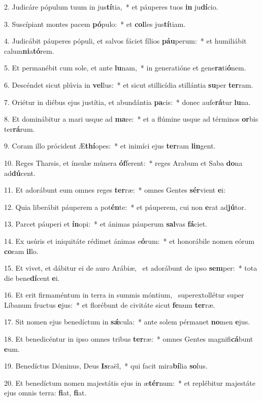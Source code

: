 2. Judicáre pópulum tuum in jus\textbf{tí}tia,~*  et páuperes tuos \textbf{in} ju\textbf{dí}cio.\

3. Suscípiant montes pacem \textbf{pó}pulo:~*  et \textbf{col}les jus\textbf{tí}tiam.\

4. Judicábit páuperes pópuli, et salvos fáciet fílios \textbf{páu}perum:~*  et humiliábit calum\textbf{ni}a\textbf{tó}rem.\

5. Et permanébit cum sole, et ante \textbf{lu}nam,~*  in generatióne et gene\textbf{ra}ti\textbf{ó}nem.\

6. Descéndet sicut plúvia in \textbf{vel}lus:~*  et sicut stillicídia stillántia \textbf{su}per \textbf{ter}ram.\

7. Oriétur in diébus ejus justítia, et abundántia \textbf{pa}cis:~*  donec aufe\textbf{rá}tur \textbf{lu}na.\

8. Et dominábitur a mari usque ad \textbf{ma}re:~*  et a flúmine usque ad términos \textbf{or}bis ter\textbf{rá}rum.\

9. Coram illo prócident Æ\textbf{thí}opes:~*  et inimíci ejus \textbf{ter}ram \textbf{lin}gent.\

10. Reges Tharsis, et ínsulæ múnera \textbf{óf}ferent:~*  reges Arabum et Saba \textbf{do}na ad\textbf{dú}cent.\

11. Et adorábunt eum omnes reges \textbf{ter}ræ:~*  omnes Gentes \textbf{sér}vient \textbf{e}i:\

12. Quia liberábit páuperem a pot\textbf{én}te:~*  et páuperem, cui non \textbf{e}rat ad\textbf{jú}tor.\

13. Parcet páuperi et \textbf{ín}opi:~*  et ánimas páuperum \textbf{sal}vas \textbf{fá}ciet.\

14. Ex usúris et iniquitáte rédimet ánimas e\textbf{ó}rum:~*  et honorábile nomen eórum \textbf{co}ram \textbf{il}lo.\

15. Et vivet, et dábitur ei de auro Arábiæ, \dag\  et adorábunt de ipso \textbf{sem}per:~*  tota die bene\textbf{dí}cent \textbf{e}i.\

16. Et erit firmaméntum in terra in summis móntium, \dag\  superextollétur super Líbanum fructus \textbf{e}jus:~*  et florébunt de civitáte sicut \textbf{fe}num \textbf{ter}ræ.\

17. Sit nomen ejus benedíctum in \textbf{sǽ}cula:~*  ante solem pérmanet \textbf{no}men \textbf{e}jus.\

18. Et benedicéntur in ipso omnes tribus \textbf{ter}ræ:~*  omnes Gentes magnifi\textbf{cá}bunt \textbf{e}um.\

19. Benedíctus Dóminus, Deus \textbf{Is}raël,~*  qui facit mira\textbf{bí}lia \textbf{so}lus.\

20. Et benedíctum nomen majestátis ejus in æ\textbf{tér}num:~*  et replébitur majestáte ejus omnis terra: \textbf{fi}at, \textbf{fi}at.\

